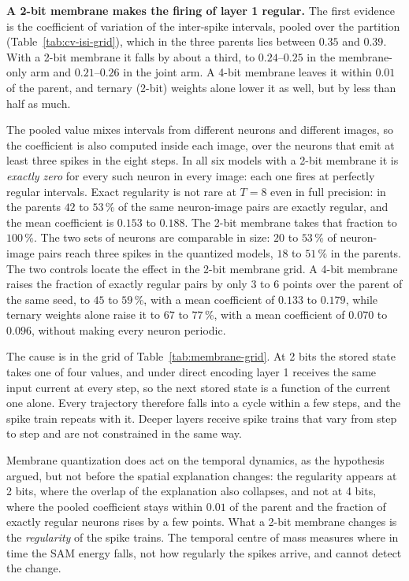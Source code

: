 \textbf{A 2-bit membrane makes the firing of layer 1 regular.} The first
evidence is the coefficient of variation of the inter-spike intervals, pooled
over the partition (Table~\ref{tab:cv-isi-grid}), which in the three parents
lies between $0.35$ and $0.39$. With a 2-bit membrane it falls by about a third,
to $0.24$--$0.25$ in the membrane-only arm and $0.21$--$0.26$ in the joint arm. A
4-bit membrane leaves it within $0.01$ of the parent, and ternary (2-bit) weights
alone lower it as well, but by less than half as much.

The pooled value mixes intervals from different neurons and different images,
so the coefficient is also computed inside each image, over the neurons that
emit at least three spikes in the eight steps. In all six models with a 2-bit
membrane it is \emph{exactly zero} for every such neuron in every image: each
one fires at perfectly regular intervals. Exact regularity is not rare at $T = 8$
even in full precision: in the parents $42$ to $53\,\%$ of the same
neuron-image pairs are exactly regular, and the mean coefficient is $0.153$ to
$0.188$. The 2-bit membrane takes that fraction to $100\,\%$. The two sets of
neurons are comparable in size: $20$ to $53\,\%$ of neuron-image pairs reach
three spikes in the quantized models, $18$ to $51\,\%$ in the parents. The two
controls locate the effect in the 2-bit membrane grid. A 4-bit membrane raises
the fraction of exactly regular pairs by only $3$ to $6$ points over the parent of
the same seed, to $45$ to $59\,\%$, with a mean coefficient of $0.133$ to
$0.179$, while ternary weights alone raise it to $67$ to $77\,\%$, with a mean
coefficient of $0.070$ to $0.096$, without making every neuron periodic.

The cause is in the grid of Table~\ref{tab:membrane-grid}. At 2 bits the stored
state takes one of four values, and under direct encoding layer 1 receives the
same input current at every step, so the next stored state is a function of the
current one alone. Every trajectory therefore falls into a cycle within a few
steps, and the spike train repeats with it. Deeper layers receive spike trains
that vary from step to step and are not constrained in the same way.

Membrane quantization does act on the temporal dynamics, as the hypothesis
argued, but not before the spatial explanation changes: the regularity appears
at 2 bits, where the overlap of the explanation also collapses, and not at 4
bits, where the pooled coefficient stays within $0.01$ of the parent and the
fraction of exactly regular neurons rises by a few points. What a 2-bit membrane changes
is the \emph{regularity} of the spike trains. The temporal centre of mass
measures where in time the SAM energy falls, not how regularly the spikes
arrive, and cannot detect the change.

